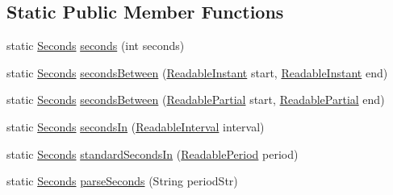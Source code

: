 \subsection*{Static Public Member Functions}
\begin{DoxyCompactItemize}
\item 
static \hyperlink{classorg_1_1joda_1_1time_1_1_seconds}{Seconds} \hyperlink{classorg_1_1joda_1_1time_1_1_seconds_a01dac82028b4db26726a52a4c15783cf}{seconds} (int seconds)
\item 
static \hyperlink{classorg_1_1joda_1_1time_1_1_seconds}{Seconds} \hyperlink{classorg_1_1joda_1_1time_1_1_seconds_ae02cad5d9180b604a350c2812e18ec94}{seconds\-Between} (\hyperlink{interfaceorg_1_1joda_1_1time_1_1_readable_instant}{Readable\-Instant} start, \hyperlink{interfaceorg_1_1joda_1_1time_1_1_readable_instant}{Readable\-Instant} end)
\item 
static \hyperlink{classorg_1_1joda_1_1time_1_1_seconds}{Seconds} \hyperlink{classorg_1_1joda_1_1time_1_1_seconds_a1f1e89f9b8ee1e7c9a4ca83c23466660}{seconds\-Between} (\hyperlink{interfaceorg_1_1joda_1_1time_1_1_readable_partial}{Readable\-Partial} start, \hyperlink{interfaceorg_1_1joda_1_1time_1_1_readable_partial}{Readable\-Partial} end)
\item 
static \hyperlink{classorg_1_1joda_1_1time_1_1_seconds}{Seconds} \hyperlink{classorg_1_1joda_1_1time_1_1_seconds_a4d8b4f9e9c6a8c27fc0d5871b7bf6249}{seconds\-In} (\hyperlink{interfaceorg_1_1joda_1_1time_1_1_readable_interval}{Readable\-Interval} interval)
\item 
static \hyperlink{classorg_1_1joda_1_1time_1_1_seconds}{Seconds} \hyperlink{classorg_1_1joda_1_1time_1_1_seconds_a03cc4992928104c7168cb356ab538bc2}{standard\-Seconds\-In} (\hyperlink{interfaceorg_1_1joda_1_1time_1_1_readable_period}{Readable\-Period} period)
\item 
static \hyperlink{classorg_1_1joda_1_1time_1_1_seconds}{Seconds} \hyperlink{classorg_1_1joda_1_1time_1_1_seconds_ae646be6a1bbe57d7fb7a9ddd9e924816}{parse\-Seconds} (String period\-Str)
\end{DoxyCompactItemize}
